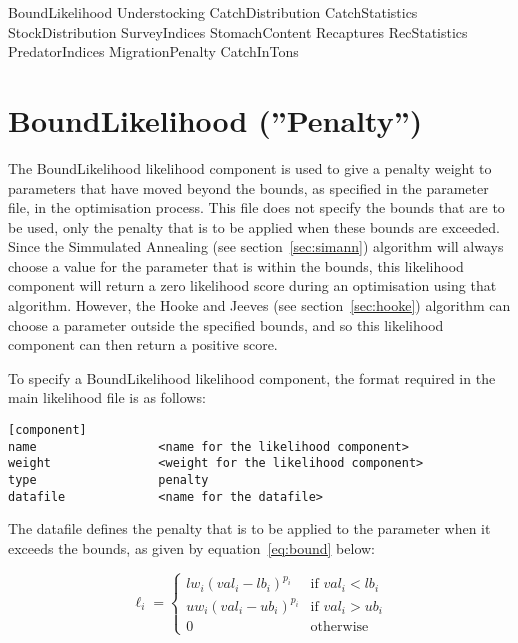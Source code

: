 \documentclass [a4paper, 10pt]{book}
\begin{document}
\bigskip
BoundLikelihood\newline
Understocking\newline
CatchDistribution\newline
CatchStatistics\newline
StockDistribution\newline
SurveyIndices\newline
StomachContent\newline
Recaptures\newline
RecStatistics\newline
PredatorIndices\newline
MigrationPenalty\newline
CatchInTons

\section{BoundLikelihood (''Penalty'')}\label{sec:boundlike}
The BoundLikelihood likelihood component is used to give a penalty weight to parameters that have moved beyond the bounds, as specified in the parameter file, in the optimisation process.  This file does not specify the bounds that are to be used, only the penalty that is to be applied when these bounds are exceeded.  Since the Simmulated Annealing (see section~\ref{sec:simann}) algorithm will always choose a value for the parameter that is within the bounds, this likelihood component will return a zero likelihood score during an optimisation using that algorithm.  However, the Hooke and Jeeves (see section~\ref{sec:hooke}) algorithm can choose a parameter outside the specified bounds, and so this likelihood component can then return a positive score.

\bigskip
To specify a BoundLikelihood likelihood component, the format required in the main likelihood file is as follows:

{\small\begin{verbatim}
[component]
name                 <name for the likelihood component>
weight               <weight for the likelihood component>
type                 penalty
datafile             <name for the datafile>
\end{verbatim}}

The datafile defines the penalty that is to be applied to the parameter when it exceeds the bounds, as given by equation~\ref{eq:bound} below:

\begin{equation}\label{eq:bound}
\ell_{i} =
\begin{cases}
  lw_{i} (val_{i} - lb_{i})^{p_{i}}
  & \textrm{if $val_{i} < lb_i$}\\
  uw_{i} (val_{i} - ub_{i})^{p_{i}}
  & \textrm{if $val_{i} > ub_i$}\\
  0
  & \textrm{otherwise}
\end{cases}
\end{equation}
\end{document}
